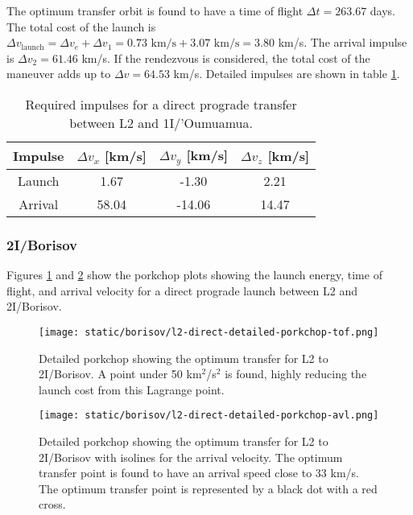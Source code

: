 The optimum transfer orbit is found to have a time of flight $\Delta t = 263.67$
days. The total cost of the launch is $\Delta v_\text{launch} = \Delta v_e +
  \Delta v_1 = 0.73 \text{ km/s} + 3.07 \text{ km/s} = 3.80$ km/s. The arrival
impulse is $\Delta v_2 = 61.46$ km/s. If the rendezvous is considered, the total
cost of the maneuver adds up to $\Delta v = 64.53$ km/s. Detailed impulses are
shown in table \ref{tab:l2-oumuamua-direct-transfer-impulses}.

\vspace{1cm}
\begin{table}[H]
  \centering
  \begin{tabular}{|c|c|c|c|}
    \hline
    Impulse & $\Delta v_x$ [km/s] & $\Delta v_y$ [km/s] & $\Delta v_z$ [km/s] \\
    \hline
    Launch  & 1.67                & -1.30               & 2.21                \\
    \hline
    Arrival & 58.04               & -14.06              & 14.47               \\
    \hline
  \end{tabular}
  \caption[Required impulses for a direct prograde transfer between L2 and
    1I/'Oumuamua]{Required impulses for a direct prograde transfer between L2 and
    1I/'Oumuamua.}
  \label{tab:l2-oumuamua-direct-transfer-impulses}
\end{table}


\subsubsection{2I/Borisov}

Figures \ref{fig:l2-borisov-optimum-porkchop} and
\ref{fig:l2-borisov-optimum-porkchop-avl} show the porkchop plots showing the
launch energy, time of flight, and arrival velocity for a direct prograde launch
between L2 and 2I/Borisov.

\begin{figure}[H]
  \centering
  \texttt{[image: static/borisov/l2-direct-detailed-porkchop-tof.png]}
  \caption[Detailed porkchop showing the optimum transfer for
    L2 to 2I/Borisov with the time of flight.]{Detailed porkchop showing the optimum transfer for
    L2 to 2I/Borisov. A point under 50 km$^2$/s$^2$ is found, highly
    reducing the launch cost from this Lagrange point.
  }
  \label{fig:l2-borisov-optimum-porkchop}
\end{figure}

\begin{figure}[H]
  \centering
  \texttt{[image: static/borisov/l2-direct-detailed-porkchop-avl.png]}
  \caption[Detailed porkchop showing the optimum transfer for
    L2 to 2I/Borisov with the arrival velocity.]{Detailed porkchop showing the
    optimum transfer for L2 to 2I/Borisov with isolines for the arrival
    velocity. The optimum transfer point is found to have an arrival speed
    close to 33 km/s. The optimum transfer point is represented by a black dot
        with a red cross.
}
  \label{fig:l2-borisov-optimum-porkchop-avl}
\end{figure}


